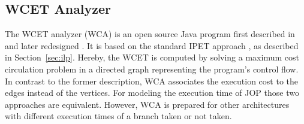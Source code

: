 %
%






\subsection{WCET Analyzer}

The WCET analyzer (WCA) is an open source Java program first
described in \cite{jop:wcet:jtres06} and later redesigned
\cite{master:huber:2009}. It is based on the standard IPET approach
\cite{Puschner:JRTS1997}, as described in Section~\ref{sec:ilp}.
Hereby, the WCET is computed by solving a maximum cost circulation
problem in a directed graph representing the program's control flow.
In contrast to the former description, WCA associates the execution
cost to the edges instead of the vertices. For modeling the execution
time of JOP those two approaches are equivalent. However, WCA is
prepared for other architectures with different execution times of a
branch taken or not taken.

